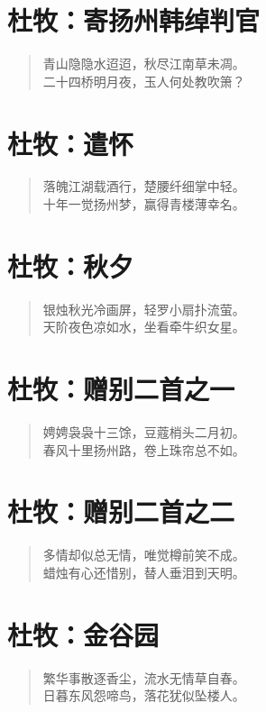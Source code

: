 \documentclass[12pt,oneside]{book}
\newenvironment{shici}{
\begin{verse}
\centering\large\hspace{12pt}}
{\end{verse}}
\begin{document}
\chapter{杜牧：寄扬州韩绰判官}
\begin{shici}
青山隐隐水迢迢，秋尽江南草未凋。\\
二十四桥明月夜，玉人何处教吹箫？
\end{shici}

\chapter{杜牧：遣怀}
\begin{shici}
落魄江湖载酒行，楚腰纤细掌中轻。\\
十年一觉扬州梦，赢得青楼薄幸名。
\end{shici}

\chapter{杜牧：秋夕}
\begin{shici}
银烛秋光冷画屏，轻罗小扇扑流萤。\\
天阶夜色凉如水，坐看牵牛织女星。
\end{shici}

\chapter{杜牧：赠别二首之一}
\begin{shici}
娉娉袅袅十三馀，豆蔻梢头二月初。\\
春风十里扬州路，卷上珠帘总不如。
\end{shici}

\chapter{杜牧：赠别二首之二}
\begin{shici}
多情却似总无情，唯觉樽前笑不成。\\
蜡烛有心还惜别，替人垂泪到天明。
\end{shici}

\chapter{杜牧：金谷园}
\begin{shici}
繁华事散逐香尘，流水无情草自春。\\
日暮东风怨啼鸟，落花犹似坠楼人。
\end{shici}
\end{document}
